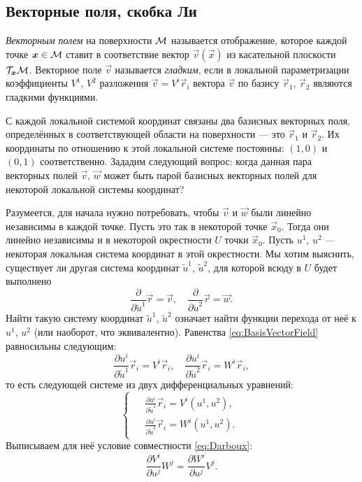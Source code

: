 \subsection{Векторные поля, скобка Ли}

\begin{definition}
	\textit{Векторным полем} на поверхности $\mathcal{M}$ называется отображение, которое каждой точке $\boldsymbol{x} \in \mathcal{M}$ ставит в соответствие вектор $\vec{v}(\vec{x})$ из касательной плоскости $\mathcal{T}_{\boldsymbol{x}}\mathcal{M}$. Векторное поле $\vec{v}$ называется \textit{гладким}, если в локальной параметризации коэффициенты $V^1$, $V^2$ разложения
	$\vec{v} = V^i\vec{r}_i$ вектора $\vec{v}$ по базису $\vec{r}_1$, $\vec{r}_2$ являются гладкими функциями.
\end{definition}

С каждой локальной системой координат связаны два базисных векторных поля, определённых в соответствующей области на поверхности --- это $\vec{r}_1$ и $\vec{r}_2$. Их координаты по отношению к этой локальной системе постоянны: $(1, 0)$ и $(0, 1)$ соответственно. Зададим следующий вопрос: когда данная пара векторных полей $\vec{v}$, $\vec{w}$ может быть парой базисных векторных полей для некоторой локальной системы координат?

Разумеется, для начала нужно потребовать, чтобы $\vec{v}$ и $\vec{w}$ были линейно независимы в каждой точке. Пусть это так в некоторой точке $\vec{x}_0$. Тогда они линейно независимы и в некоторой окрестности $U$ точки $\vec{x}_0$. Пусть $u^1$, $u^2$ --- некоторая локальная система координат в этой окрестности. Мы хотим выяснить, существует ли другая система координат $\widetilde{u}^1$, $\widetilde{u}^2$, для которой всюду в $U$ будет выполнено
\begin{equation} \label{eq:BasisVectorField}
	\frac{\partial}{\partial\widetilde{u}^1}\vec{r} = \vec{v},\quad \frac{\partial}{\partial\widetilde{u}^2}\vec{r} = \vec{w}.
\end{equation}
Найти такую систему координат $\widetilde{u}^1$, $\widetilde{u}^2$ означает найти функции перехода от неё к $u^1$, $u^2$ (или наоборот, что эквивалентно). Равенства \eqref{eq:BasisVectorField} равносильны следующим:
\[
	\frac{\partial u^i}{\partial \widetilde{u}^1}\vec{r}_i = V^i\vec{r}_i,\quad
	\frac{\partial u^i}{\partial \widetilde{u}^2}\vec{r}_i = W^i\vec{r}_i,
\]
то есть следующей системе из двух дифференциальных уравнений:
\[
	\begin{cases}
		\begin{aligned}
			& \frac{\partial u^i}{\partial\widetilde{u}^1}\vec{r}_i = V^i(u^1, u^2),\\
			& \frac{\partial u^i}{\partial\widetilde{u}^2}\vec{r}_i = W^i(u^1, u^2).
		\end{aligned}
	\end{cases}
\]
Выписываем для неё условие совместности \eqref{eq:Darboux}:
\[
	\frac{\partial V^i}{\partial u^j}W^j = \frac{\partial W^i}{\partial u^j}V^j.
\]


